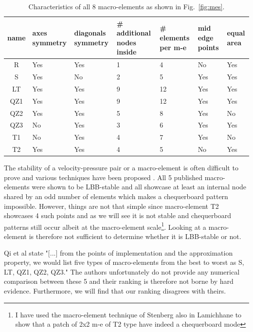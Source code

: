 \documentclass[a4paper,12pt]{article}
\begin{document}
\begin{table}
\centering
\begin{tabular}{cp{2cm}p{2cm}p{2.5cm}p{2cm}p{2cm}p{2cm}}
\hline
{name} & {axes symmetry}  & {diagonals symmetry} & {\# additional nodes inside} 
& {\# elements per m-e} & {mid edge points} & equal area \\
\hline
\hline
R   &  Yes &  Yes & 1  & 4 & No  & Yes\\
S   &  Yes &   No & 2  & 5 & Yes & Yes\\
LT  &  Yes &  Yes & 9 & 12 & Yes & Yes\\
QZ1 &  Yes &  Yes & 9 & 12 & Yes & Yes\\
QZ2 &  Yes &  Yes & 5 & 8  & Yes & No\\
QZ3 &  No  &  Yes & 3 & 6  & Yes & Yes\\
T1  &  No  &  Yes & 4 & 7  & Yes & No\\
T2  &  Yes &  Yes & 4 & 5  & No  & Yes\\
\hline
\end{tabular}
\caption{Characteristics of all 8 macro-elements as shown in Fig.~\ref{fig:mes}.\label{tab1}}%
\end{table}

The stability of a velocity-pressure pair or a macro-element is often difficult to prove 
and various techniques have been proposed \cite{bobf13}. 
All 5 published macro-elements were shown to be LBB-stable and all showcase at least 
an internal node shared by an odd number of elements which makes a chequerboard pattern impossible. 
However, things are not that simple since macro-element T2 showcases 
4 such points and as we will see it is not stable and chequerboard patterns still occur 
albeit at the macro-element scale\footnote{I have used the macro-element technique of Stenberg 
also in Lamichhane to show that a patch of 2x2 m-e of T2 type have indeed a chequerboard mode}. 
Looking at a macro-element is therefore not sufficient to determine whether it is LBB-stable or not. 

Qi et al \cite{qizh07} state "[...] from the points of implementation and the approximation property, we 
would list five types of macro-elements from the best to worst as S, LT, QZ1, QZ2, QZ3." 
The authors unfortunately do not provide any numerical comparison between these 5 and their 
ranking is therefore not borne by hard evidence. Furthermore, we will find that our ranking disagrees with theirs. 
\end{document}
